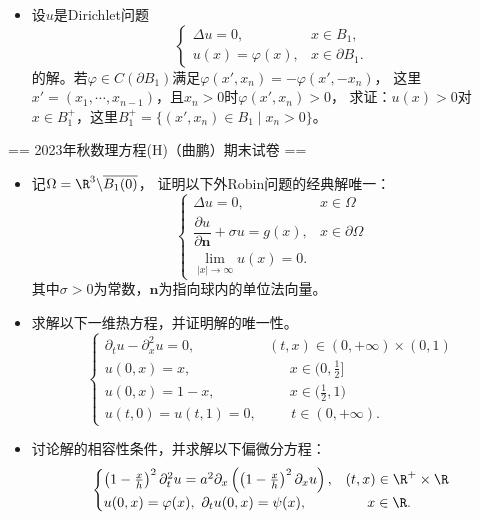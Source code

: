 \begin{itemize}
    \item[7.] 设$u$是Dirichlet问题
    \[\begin{cases}
        \Delta u=0,&x\in B_1,\\
        u(x)=\varphi(x),&x\in\partial B_1.
    \end{cases}\]
    的解。若$\varphi\in C(\partial B_1)$满足$\varphi(x',x_n)=-\varphi(x',-x_n)$，
    这里$x'=(x_1,\cdots,x_{n-1})$，且$x_n>0$时$\varphi(x',x_n)>0$，
    求证：$u(x)>0$对$x\in B_1^+$，这里$B_1^+=\{(x',x_n)\in B_1\mid x_n>0\}$。
\end{itemize}

== 2023年秋数理方程(H)（曲鹏）期末试卷 ==

\begin{itemize}
    \item[1.] 记$ \Omega =\R^3\backslash\overline{B_1(0)}$，
    证明以下外Robin问题的经典解唯一：
    \[
    \begin{cases}
        \Delta u=0,&x\in\Omega\\
        \dfrac{\partial u}{\partial\boldsymbol{n}}+\sigma u=g(x),&x\in\partial \Omega\\
        \lim\limits_{|x|\rightarrow \infty}u(x)=0.&
    \end{cases}
    \]
    其中$\sigma>0$为常数，$\boldsymbol{n}$为指向球内的单位法向量。

    \item[2.] 求解以下一维热方程，并证明解的唯一性。
    \[\begin{cases}
        \partial_tu-\partial_x^2u=0,&(t,x)\in(0,+\infty)\times(0,1)\\
        u(0,x)=x,&\quad\ \,\,x\in\big(0,\frac12\big]\\
        u(0,x)=1-x,&\quad\ \,\,x\in\big(\frac12,1\big)\\
        u(t,0)=u(t,1)=0,&\ \ \ \quad t\in(0,+\infty).
    \end{cases}\]

    \item[3.] 讨论解的相容性条件，并求解以下偏微分方程：
    \[
    \begin{cases}
        \left( 1-\frac{x}{h} \right)^2 \partial _{t}^{2}u
        =a^2\partial _x\left( \left( 1-\frac{x}{h} \right) ^2\partial _xu \right),
        & (t,x)\in\R^+\times\R\\
    	u( 0,x ) =\varphi(x),\ \partial _tu( 0,x ) =\psi(x),
        & \hspace{1.55em} x\in\R.\\
    \end{cases}
    \]


\end{itemize}
